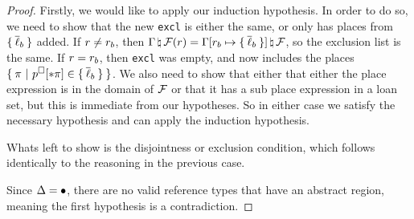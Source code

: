 \begin{proof}
  Firstly, we would like to apply our induction hypothesis. In order to do so,
  we need to show that the new \texttt{excl} is either the same, or only has
  places from $\{ \: \overline{\ell}_b \: \}$ added. If $r \neq r_b$, then
  $\Gamma \, \natural \, \mathcal{F}(r) = \Gamma[r_b
      \mapsto \{ \: \overline{\ell}_b \: \}] \, \natural \, \mathcal{F}$, so the exclusion list is the
  same. If $r = r_b$, then \texttt{excl} was empty, and now
  includes the places $\oxset{\oxplace \ | \ \oxplaceexprctx[\oxderef\oxplace]
    \in \oxset{\oxloans_b}}$. We also need to show that either that either the
  place expression is in the domain of $\mathcal{F}$ or that it has a sub place
  expression in a loan set, but this is immediate from our hypotheses. So in
  either case we satisfy the necessary hypothesis and can apply the induction
  hypothesis.

  Whats left to show is the disjointness or exclusion condition, which follows
  identically to the reasoning in the previous case.

  \vspace{1em}
  \noindent \framebox[\textwidth]{ \figuresize
    \begin{mathpar}
      \ODerefAbs
    \end{mathpar}
  } \vspace{1em}

  Since $\Delta = \bullet$, there are no valid reference types that have
  an abstract region, meaning the first hypothesis is a contradiction.
\end{proof}

